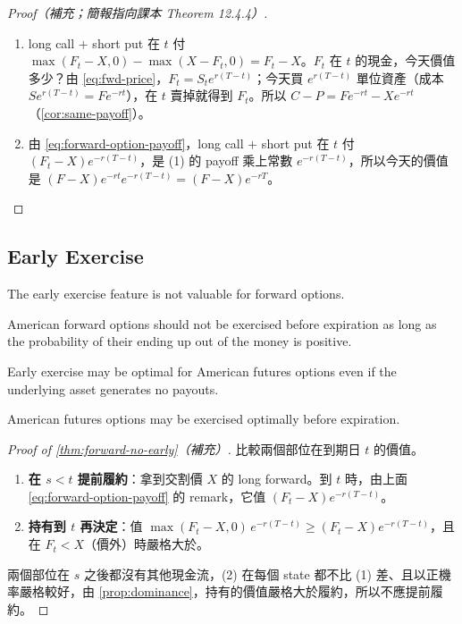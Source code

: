 \begin{proof}[Proof（補充；簡報指向課本 Theorem 12.4.4）]
	\begin{enumerate}[(1),nosep]
		\item long call $+$ short put 在 $t$ 付 $\max(F_{t}-X,0)-\max(X-F_{t},0)=F_{t}-X$。$F_{t}$ 在 $t$ 的現金，今天價值多少？由 \eqref{eq:fwd-price}，$F_{t}=S_{t}e^{r(T-t)}$；今天買 $e^{r(T-t)}$ 單位資產（成本 $Se^{r(T-t)}=Fe^{-rt}$），在 $t$ 賣掉就得到 $F_{t}$。所以 $C-P=Fe^{-rt}-Xe^{-rt}$（\autoref{cor:same-payoff}）。
		\item 由 \eqref{eq:forward-option-payoff}，long call $+$ short put 在 $t$ 付 $(F_{t}-X)e^{-r(T-t)}$，是 (1) 的 payoff 乘上常數 $e^{-r(T-t)}$，所以今天的價值是 $(F-X)e^{-rt}e^{-r(T-t)}=(F-X)e^{-rT}$。
	\end{enumerate}
\end{proof}
\suppend

\subsection{Early Exercise}


The early exercise feature is not valuable for forward options.

\begin{theorem}
	\label{thm:forward-no-early}
	American forward options should not be exercised before expiration as long as the probability of their ending up out of the money is positive.
\end{theorem}

Early exercise may be optimal for American futures options even if the underlying asset generates no payouts.

\begin{theorem}
	\label{thm:futures-early}
	American futures options may be exercised optimally before expiration.
\end{theorem}

\suppstart
{}

\begin{proof}[Proof of \autoref{thm:forward-no-early}（補充）]
	比較兩個部位在到期日 $t$ 的價值。
	\begin{enumerate}[(1),nosep]
		\item \textbf{在 $s<t$ 提前履約}：拿到交割價 $X$ 的 long forward。到 $t$ 時，由上面 \eqref{eq:forward-option-payoff} 的 remark，它值 $(F_{t}-X)e^{-r(T-t)}$。
		\item \textbf{持有到 $t$ 再決定}：值 $\max(F_{t}-X,0)\,e^{-r(T-t)}\ge(F_{t}-X)e^{-r(T-t)}$，且在 $F_{t}<X$（價外）時嚴格大於。
	\end{enumerate}
	兩個部位在 $s$ 之後都沒有其他現金流，(2) 在每個 state 都不比 (1) 差、且以正機率嚴格較好，由 \autoref{prop:dominance}，持有的價值嚴格大於履約，所以不應提前履約。
\end{proof}

